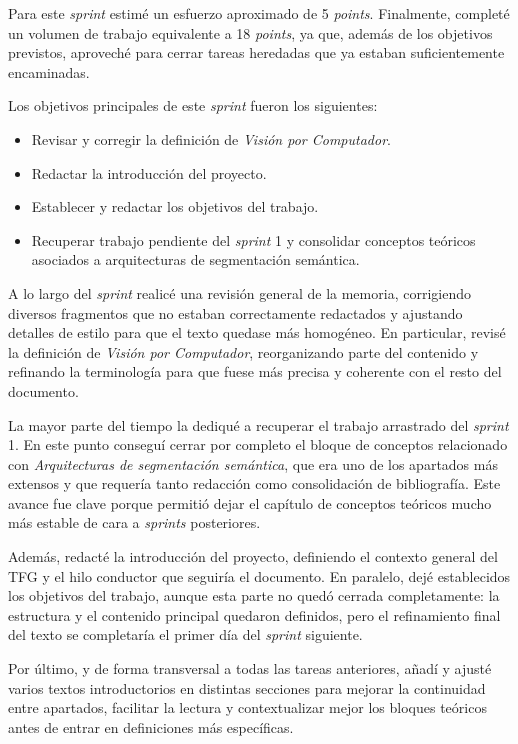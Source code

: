 Para este \textit{sprint} estimé un esfuerzo aproximado de 5 \textit{points}. Finalmente, completé un volumen de trabajo equivalente a 18 \textit{points}, ya que, además de los objetivos previstos, aproveché para cerrar tareas heredadas que ya estaban suficientemente encaminadas.

Los objetivos principales de este \textit{sprint} fueron los siguientes:
\begin{itemize}
	\item Revisar y corregir la definición de \textit{Visión por Computador}.
	\item Redactar la introducción del proyecto.
	\item Establecer y redactar los objetivos del trabajo.
	\item Recuperar trabajo pendiente del \textit{sprint} 1 y consolidar conceptos teóricos asociados a arquitecturas de segmentación semántica.
\end{itemize}

A lo largo del \textit{sprint} realicé una revisión general de la memoria, corrigiendo diversos fragmentos que no estaban correctamente redactados y ajustando detalles de estilo para que el texto quedase más homogéneo. En particular, revisé la definición de \textit{Visión por Computador}, reorganizando parte del contenido y refinando la terminología para que fuese más precisa y coherente con el resto del documento.

La mayor parte del tiempo la dediqué a recuperar el trabajo arrastrado del \textit{sprint} 1. En este punto conseguí cerrar por completo el bloque de conceptos relacionado con \textit{Arquitecturas de segmentación semántica}, que era uno de los apartados más extensos y que requería tanto redacción como consolidación de bibliografía. Este avance fue clave porque permitió dejar el capítulo de conceptos teóricos mucho más estable de cara a \textit{sprints} posteriores.

Además, redacté la introducción del proyecto, definiendo el contexto general del TFG y el hilo conductor que seguiría el documento. En paralelo, dejé establecidos los objetivos del trabajo, aunque esta parte no quedó cerrada completamente: la estructura y el contenido principal quedaron definidos, pero el refinamiento final del texto se completaría el primer día del \textit{sprint} siguiente.

Por último, y de forma transversal a todas las tareas anteriores, añadí y ajusté varios textos introductorios en distintas secciones para mejorar la continuidad entre apartados, facilitar la lectura y contextualizar mejor los bloques teóricos antes de entrar en definiciones más específicas.

